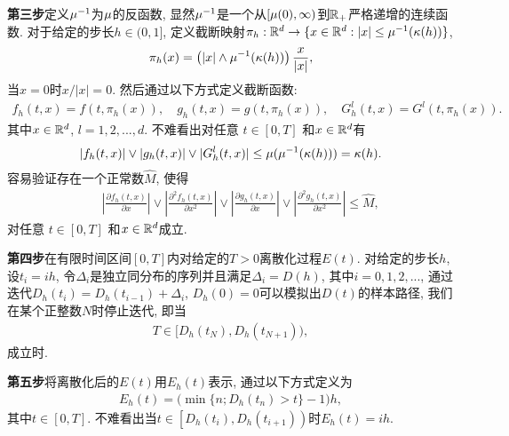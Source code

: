 {\bf 第三步}定义$\mu^{-1}$为$\mu$的反函数, 显然$\mu^{-1}$是一个从$[\mu(0),\infty)$到$\mathbb{R}_+$严格递增的连续函数. 对于给定的步长$h \in (0,1]$, 定义截断映射$\pi_{h}:\mathbb{R}^d \rightarrow \{ x\in \mathbb{R}^d:|x|\leq \mu^{-1}(\kappa(h))\}$,
\begin{align*}
    \pi_{h}(x)=\left(|x|\wedge\mu^{-1}(\kappa(h))\right)\frac{x}{|x|},
\end{align*}
当$x=0$时$x/|x|=0$. 然后通过以下方式定义截断函数:
\begin{align*}
    f_{h}(t,x)=f(t,\pi_{h}(x)),\quad g_{h}(t,x)=g(t,\pi_{h}(x)),\quad G^{l}_{h}(t,x)=G^{l}(t,\pi_{h}(x)).
\end{align*}
其中$x\in \mathbb{R}^d$, $l = 1,2, ...,d$. 不难看出对任意 $t\in[0,T]$ 和$x \in \mathbb{R}^d$有
\begin{align}
    \label{equ01}
    |f_{h}(t,x)|\vee |g_{h}(t,x)|\vee |G^{l}_{h}(t,x)|\leq \mu(\mu^{-1}(\kappa(h)))=\kappa(h).
\end{align}
容易验证存在一个正常数$\hat{M}$, 使得
\begin{eqnarray*}
    &&|\frac{\partial f_{h}(t,x)}{\partial x}|\vee|\frac{\partial^{2} f_{h}(t,x)}{\partial x^{2}}|\vee|\frac{\partial g_{h}(t,x)}{\partial x}|\vee|\frac{\partial^{2} g_{h}(t,x)}{\partial x^{2}}|\leq \hat{M},
\end{eqnarray*}
对任意 $t\in[0,T]$ 和$x \in \mathbb{R}^d$成立.
\par \noindent

{\bf 第四步}在有限时间区间$[0,T]$内对给定的$T>0$离散化过程$E(t)$. 对给定的步长$h$, 设$t_{i}=ih$, 令$\Delta_i$是独立同分布的序列并且满足$\Delta_i=D(h)$, 其中$i = 0, 1, 2,...$,  通过迭代$D_h(t_i) = D_h(t_{i-1} )+ \Delta_i$, $D_h(0) = 0$可以模拟出$D(t)$的样本路径, 我们在某个正整数$N$时停止迭代, 即当
\begin{align*}
    T \in [ D_h(t_{N}), D_h(t_{N+1})),
\end{align*}
成立时.
\par
{\bf 第五步}将离散化后的$E(t)$用$E_h(t)$表示, 通过以下方式定义为
\begin{align}\label{findEht}
    E_h(t) = \big(\min\{n; D_h(t_n) > t\} - 1\big)h,
\end{align}
其中$t\in [0,T]$. 不难看出当$\text{$t\in \left[ D_h(t_{i}),D_h(t_{i+1})\right)$时}E_h(t) = ih$.


